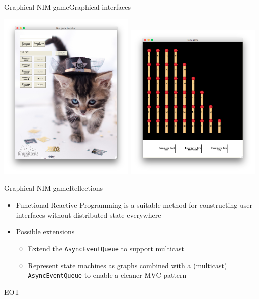\documentclass{beamer}
\begin{document}
\begin{frame}{Graphical NIM game}{Graphical interfaces}
\begin{center}
\includegraphics[width=0.49\textwidth]{launcher_ui} \includegraphics[width=0.49\textwidth]{game_ui}
\end{center}
\end{frame}

\begin{frame}{Graphical NIM game}{Reflections}
  \begin{itemize}
  \item {
    Functional Reactive Programming is a suitable method for constructing user interfaces without distributed state everywhere
  }
  \item {
    Possible extensions
  }
    \begin{itemize}
      \item Extend the \texttt{AsyncEventQueue} to support multicast
      \item Represent state machines as graphs combined with a (multicast) \texttt{AsyncEventQueue} to enable a cleaner MVC pattern
    \end{itemize}
  \end{itemize}
\end{frame}

\begin{frame}[plain,c]
\begin{center}
\Huge EOT\\
\end{center}
\end{frame}
\end{document}
